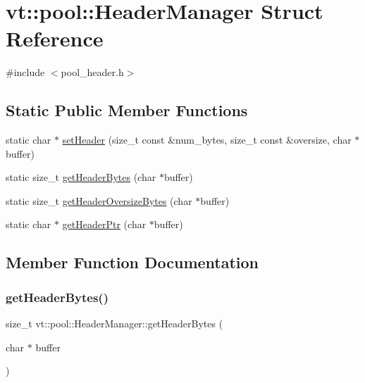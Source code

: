 \hypertarget{structvt_1_1pool_1_1_header_manager}{}\section{vt\+:\+:pool\+:\+:Header\+Manager Struct Reference}
\label{structvt_1_1pool_1_1_header_manager}


{\ttfamily \#include $<$pool\+\_\+header.\+h$>$}

\subsection*{Static Public Member Functions}
\begin{DoxyCompactItemize}
\item 
static char $\ast$ \hyperlink{structvt_1_1pool_1_1_header_manager_a1a11da8d1cf25c68ac3ff7ded5eb3a82}{set\+Header} (size\+\_\+t const \&num\+\_\+bytes, size\+\_\+t const \&oversize, char $\ast$buffer)
\item 
static size\+\_\+t \hyperlink{structvt_1_1pool_1_1_header_manager_ab244141fad3a844ac1b66fe83d12f105}{get\+Header\+Bytes} (char $\ast$buffer)
\item 
static size\+\_\+t \hyperlink{structvt_1_1pool_1_1_header_manager_a4b6ab8aab1f6f1a5b6f7da2b39914567}{get\+Header\+Oversize\+Bytes} (char $\ast$buffer)
\item 
static char $\ast$ \hyperlink{structvt_1_1pool_1_1_header_manager_a56ed12c2d6a6de2c2c543ecb95fb4838}{get\+Header\+Ptr} (char $\ast$buffer)
\end{DoxyCompactItemize}


\subsection{Member Function Documentation}
\mbox{\label{structvt_1_1pool_1_1_header_manager_ab244141fad3a844ac1b66fe83d12f105}} 
\subsubsection{\texorpdfstring{get\+Header\+Bytes()}{getHeaderBytes()}}
{\footnotesize\ttfamily size\+\_\+t vt\+::pool\+::\+Header\+Manager\+::get\+Header\+Bytes (\begin{DoxyParamCaption}\item[{char $\ast$}]{buffer }\end{DoxyParamCaption})\hspace{0.3cm}{\ttfamily [static]}}

